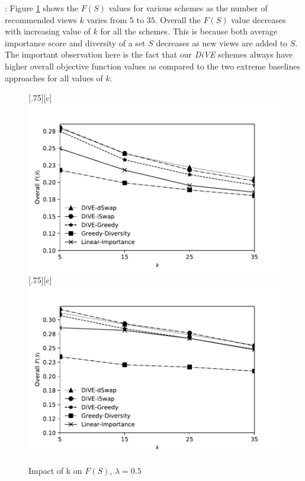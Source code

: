 {:} 
Figure \ref{fig:objf_3_datasets} shows the $F\left(S\right)$ values for various schemes as the number of recommended views $k$ varies from $5$ to $35$. 
%
Overall the $F\left(S\right)$ value decreases with increasing value of $k$ for all the schemes. 
%
This is because both average importance score and diversity of a set $S$ decreases as new views are added to $S$. 
%
The important observation here is the fact that our {\em DiVE} schemes always have higher overall objective function values as compared to the two extreme baselines approaches for all values of $k$. 

\begin{figure}[t]
	\centering
	[.75\linewidth][c]{%
		\includegraphics[width=.75\linewidth]{figures/results/objf_heart_2}} \\ 
	[.75\linewidth][c]{%
		\includegraphics[width=.75\linewidth]{figures/results/objf_flights}}
								\vspace{-10pt}				
	\caption{Impact of k on $F\left(S\right)$, $\lambda = 0.5$}
	\label{fig:objf_3_datasets}
\end{figure}




